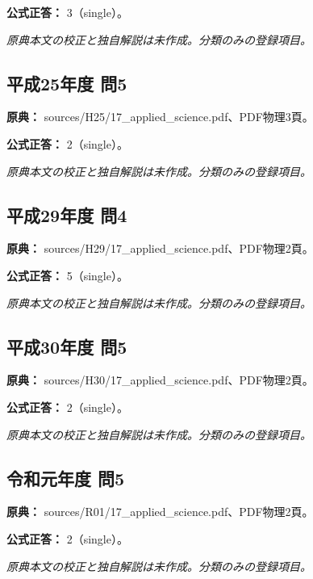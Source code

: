 \textbf{公式正答：} 3（single）。

\par\textit{原典本文の校正と独自解説は未作成。分類のみの登録項目。}

\subsection{平成25年度 問5}
\label{q:h25-reg-applied-05}

\noindent\textbf{原典：} sources/H25/17\_applied\_science.pdf、PDF物理3頁。

\textbf{公式正答：} 2（single）。

\par\textit{原典本文の校正と独自解説は未作成。分類のみの登録項目。}

\subsection{平成29年度 問4}
\label{q:h29-reg-applied-04}

\noindent\textbf{原典：} sources/H29/17\_applied\_science.pdf、PDF物理2頁。

\textbf{公式正答：} 5（single）。

\par\textit{原典本文の校正と独自解説は未作成。分類のみの登録項目。}

\subsection{平成30年度 問5}
\label{q:h30-reg-applied-05}

\noindent\textbf{原典：} sources/H30/17\_applied\_science.pdf、PDF物理2頁。

\textbf{公式正答：} 2（single）。

\par\textit{原典本文の校正と独自解説は未作成。分類のみの登録項目。}

\subsection{令和元年度 問5}
\label{q:r01-reg-applied-05}

\noindent\textbf{原典：} sources/R01/17\_applied\_science.pdf、PDF物理2頁。

\textbf{公式正答：} 2（single）。

\par\textit{原典本文の校正と独自解説は未作成。分類のみの登録項目。}

